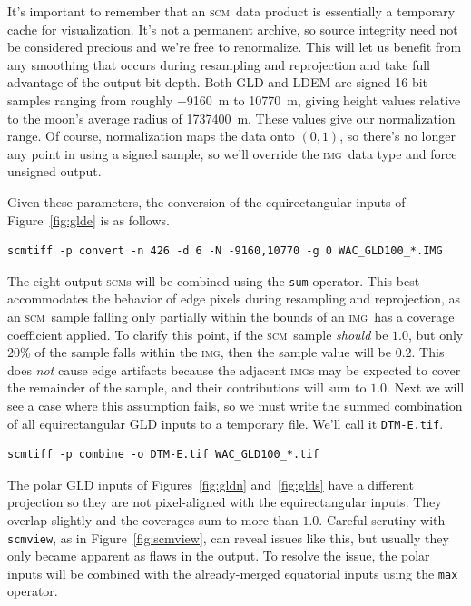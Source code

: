 \documentclass[oneside,10pt]{memoir}
\newcommand{\scm}     {\textsc{scm}}
\newcommand{\img}     {\textsc{img}}
\newcommand{\scmview} {\texttt{scmview}}
\begin{document}
\begin{Spacing}{1.1}
It's important to remember that an \scm\ data product is essentially a temporary cache for visualization. It's not a permanent archive, so source integrity need not be considered precious and we're free to renormalize. This will let us benefit from any smoothing that occurs during resampling and reprojection and take full advantage of the output bit depth. Both GLD and LDEM are signed 16-bit samples ranging from roughly \SI{-9160}{\meter} to \SI{10770}{\meter}, giving height values relative to the moon's average radius of \SI{1737400}{\meter}. These values give our normalization range. Of course, normalization maps the data onto $(0,1)$, so there's no longer any point in using a signed sample, so we'll override the \img\ data type and force unsigned output.

Given these parameters, the conversion of the equirectangular inputs of Figure~\ref{fig:glde} is as follows.

\begin{Verbatim}
scmtiff -p convert -n 426 -d 6 -N -9160,10770 -g 0 WAC_GLD100_*.IMG
\end{Verbatim}

The eight output \scm s will be combined using the \texttt{sum} operator. This best accommodates the behavior of edge pixels during resampling and reprojection, as an \scm\ sample falling only partially within the bounds of an \img\ has a coverage coefficient applied. To clarify this point, if the \scm\ sample \emph{should} be $1.0$, but only $20\%$ of the sample falls within the \img, then the sample value will be $0.2$. This does \emph{not} cause edge artifacts because the adjacent \img s may be expected to cover the remainder of the sample, and their contributions will sum to $1.0$. Next we will see a case where this assumption fails, so we must write the summed combination of all equirectangular GLD inputs to a temporary file. We'll call it \texttt{DTM-E.tif}.

\begin{Verbatim}
scmtiff -p combine -o DTM-E.tif WAC_GLD100_*.tif
\end{Verbatim}

The polar GLD inputs of Figures~\ref{fig:gldn} and~\ref{fig:glds} have a different projection so they are not pixel-aligned with the equirectangular inputs. They overlap slightly and the coverages sum to more than $1.0$. Careful scrutiny with \scmview, as in Figure~\ref{fig:scmview}, can reveal issues like this, but usually they only became apparent as flaws in the output. To resolve the issue, the polar inputs will be combined with the already-merged equatorial inputs using the \texttt{max} operator.


\end{Spacing}
\end{document}
